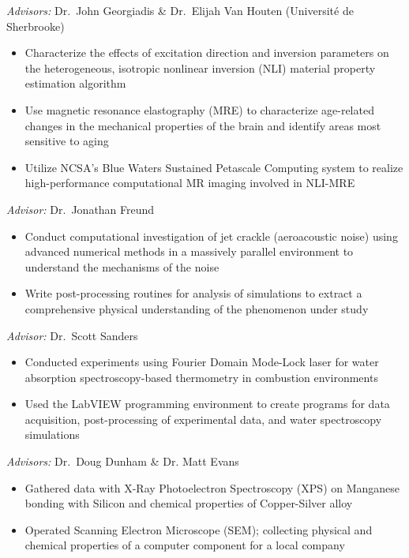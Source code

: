 \documentclass[11pt,letterpaper,sans]{moderncv}
\begin{document}
%
  {\textit{Advisors:} Dr.\ John Georgiadis \& Dr.\ Elijah Van Houten (Universit\'{e} de Sherbrooke)
  \begin{itemize}
	\item Characterize the effects of excitation direction and inversion parameters on the heterogeneous, isotropic nonlinear inversion (NLI) material property estimation algorithm
  	\item Use magnetic resonance elastography (MRE) to characterize age-related changes in the mechanical properties of the brain and identify areas most sensitive to aging
	\item Utilize NCSA's Blue Waters Sustained Petascale Computing system to realize high-performance computational MR imaging involved in NLI-MRE
  \end{itemize}
  }

%
  {\textit{Advisor:} Dr.\ Jonathan Freund
  \begin{itemize}
  	\item Conduct computational investigation of jet crackle (aeroacoustic noise) using advanced numerical methods in a massively parallel environment to understand the mechanisms of the noise
	\item Write post-processing routines for analysis of simulations to extract a comprehensive physical understanding of the phenomenon under study
  \end{itemize}
  }

%
  {\textit{Advisor:} Dr.\ Scott Sanders
  \begin{itemize}
  	\item Conducted experiments using Fourier Domain Mode-Lock laser for water absorption spectroscopy-based thermometry in combustion environments
	\item Used the LabVIEW programming environment to create programs for data acquisition, post-processing of experimental data, and water spectroscopy simulations
  \end{itemize}
  }

%
  {\textit{Advisors:} Dr.\ Doug Dunham \& Dr. Matt Evans
  \begin{itemize}
  	\item Gathered data with X-Ray Photoelectron Spectroscopy (XPS) on Manganese bonding with Silicon and chemical properties of Copper-Silver alloy
	\item Operated Scanning Electron Microscope (SEM); collecting physical and chemical properties of a computer component for a local company
  \end{itemize}
  }
\end{document}
